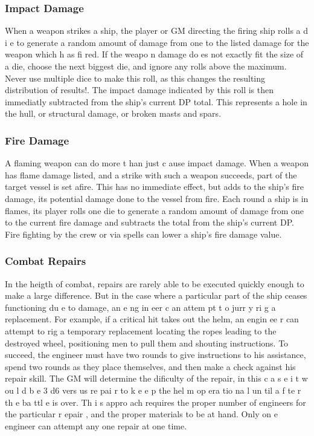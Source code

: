 \begin{multicols*}{2}
\subsubsection{Impact Damage}
When a weapon strikes a ship, the player or GM
directing the firing ship rolls a d i e to generate a random
amount of damage from one to the listed damage for the
weapon which h as fi red. If the weapo n damage do es not
exactly fit the size of a die, choose the next biggest die, and
ignore any rolls above the maximum. Never use multiple dice
to make this roll, as this changes the resulting distribution of
results!.
The impact damage indicated by this roll is then
immediatly subtracted from the ship’s current DP total. This
represents a hole in the hull, or structural damage, or broken
masts and spars.
\subsubsection{Fire Damage}
A flaming weapon can do more t han just c ause
impact damage. When a weapon has flame damage listed, and
a strike with such a weapon succeeds, part of the target vessel
is set afire. This has no immediate effect, but adds to the
ship’s fire damage, its potential damage done to the vessel
from fire. Each round a ship is in flames, its player rolls one
die to generate a random amount of damage from one to the
current fire damage and subtracts the total from the ship’s
current DP. Fire fighting by the crew or via spells can lower a
ship’s fire damage value.
\subsubsection{Combat Repairs}
In the heigth of combat, repairs are rarely able to be
executed quickly enough to make a large difference. But in
the case where a particular part of the ship ceases functioning
du e to damage, an e ng in eer c an attem pt t o jurr y ri g a
replacement. For example, if a critical hit takes out the helm,
an engin ee r can attempt to rig a temporary replacement
locating the ropes leading to the destroyed wheel, positioning
men to pull them and shouting instructions.
To succeed, the engineer must have two rounds to
give instructions to his assistance, spend two rounds as they
place themselves, and then make a check against his repair
skill. The GM will determine the dificulty of the repair, in this
c a s e i t w ou l d b e 3 d6 vers us re pai r to k e e p the hel m
op era tio na l un til a f te r th e ba ttl e is over. Th i s appro ach
requires the proper number of engineers for the particular
r epair , and the proper materials to be at hand. Only on e
engineer can attempt any one repair at one time.

\end{multicols*}
